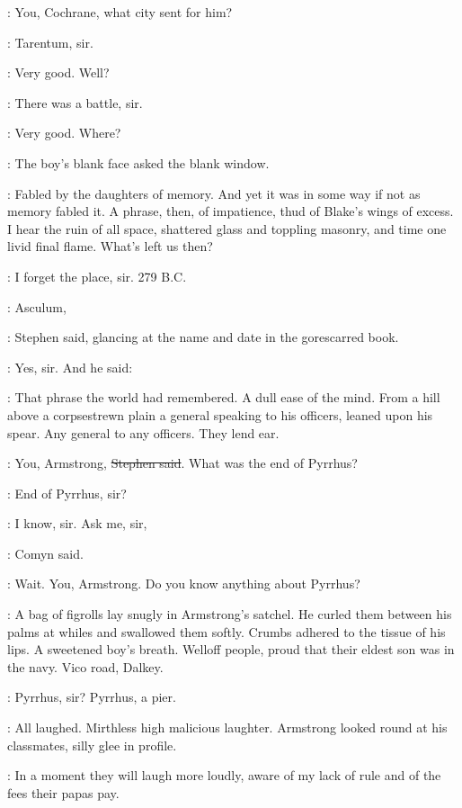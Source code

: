 \Stephen:
You, Cochrane, what city sent for him?

\cochrane:
Tarentum, sir.

\Stephen:
Very good. Well?

\cochrane:
There was a battle, sir.

\Stephen:
Very good.
Where?

:
The boy's blank face asked the blank window.

\StephenInt:
Fabled by the daughters of memory.
And yet it was in some way if not as memory fabled it.
A phrase, then, of impatience, thud of Blake's wings of excess.
I hear the ruin of all space, shattered glass and toppling masonry,
and time one livid final flame.
What's left us then?

\cochrane:
I forget the place, sir.
279 B.C.

\Stephen:
Asculum,

:
Stephen said, glancing at the name and date in the gorescarred book.

\cochrane:
Yes, sir.
And he said: 

\StephenInt:
That phrase the world had remembered.
A dull ease of the mind.
From a hill above a corpsestrewn plain
a general speaking to his officers, leaned upon his spear.
Any general to any officers.
They lend ear.

\Stephen:
You, Armstrong, \sout{Stephen said}.
What was the end of Pyrrhus?

\armstrong:
End of Pyrrhus, sir?

\comyn:
I know, sir.
Ask me, sir,

:
Comyn said.

\Stephen:
Wait.
You, Armstrong.
Do you know anything about Pyrrhus?

:
A bag of figrolls lay snugly in Armstrong's satchel.
He curled them between his palms at whiles and swallowed them softly.
Crumbs adhered to the tissue of his lips.
A sweetened boy's breath.
Welloff people, proud that their eldest son was in the navy.
Vico road, Dalkey.

\armstrong:
Pyrrhus, sir?
Pyrrhus, a pier.

:
All laughed.
Mirthless high malicious laughter.
Armstrong looked round at his classmates, silly glee in profile.

\StephenInt:
In a moment they will laugh more loudly,
aware of my lack of rule and of the fees their papas pay.

